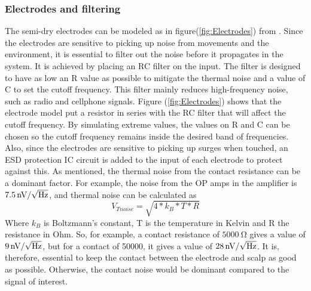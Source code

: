 \subsubsection{Electrodes and filtering}
The semi-dry electrodes can be modeled as in figure(\ref{fig:Electrodes}) from \cite{electrodmodel}. Since the electrodes are sensitive to picking up noise from movements and the environment, it is essential to filter out the noise before it propagates in the system. It is achieved by placing an RC filter on the input. The filter is designed to have as low an R value as possible to mitigate the thermal noise and a value of C to set the cutoff frequency. This filter mainly reduces high-frequency noise, such as radio and cellphone signals. Figure (\ref{fig:Electrodes}) shows that the electrode model put a resistor in series with the RC filter that will affect the cutoff frequency. By simulating extreme values, the values on R and C can be chosen so the cutoff frequency remains inside the desired band of frequencies. Also, since the electrodes are sensitive to picking up surges when touched, an ESD protection IC circuit is added to the input of each electrode to protect against this. As mentioned, the thermal noise from the contact resistance can be a dominant factor. For example, the noise from the OP amps in the amplifier is $\SI{7.5}{\nano\volt/\sqrt{\hertz}}$, and thermal noise can be calculated as
\begin{equation}
    V_{Tnoise}=\sqrt{4*k_B*T*R}
\end{equation}
Where $k_B$ is Boltzmann's constant, T is the temperature in Kelvin and R the resistance in Ohm. So, for example, a contact resistance of $\SI{5000}{\ohm}$ gives a value of $\SI{9}{\nano\volt/\sqrt{\hertz}}$, but for a contact of 50000, it gives a value of $\SI{28}{\nano\volt/\sqrt{\hertz}}$. It is, therefore, essential to keep the contact between the electrode and scalp as good as possible. Otherwise, the contact noise would be dominant compared to the signal of interest.

